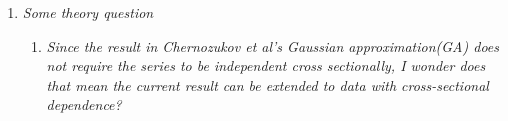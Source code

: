 \documentclass[a4paper,12pt]{article}
\begin{document}
\begin{enumerate}[label=(\arabic*),leftmargin=0.7cm]


  


\item \textit{Some theory question}

\begin{enumerate}[label=(\alph*),leftmargin=0.7cm]
\item \textit{Since the result in Chernozukov et al's Gaussian approximation(GA) does not require the series to be independent cross sectionally, I wonder does that mean the current result can be extended to data with cross-sectional dependence?}


\end{enumerate}
\end{enumerate}
\end{document}
